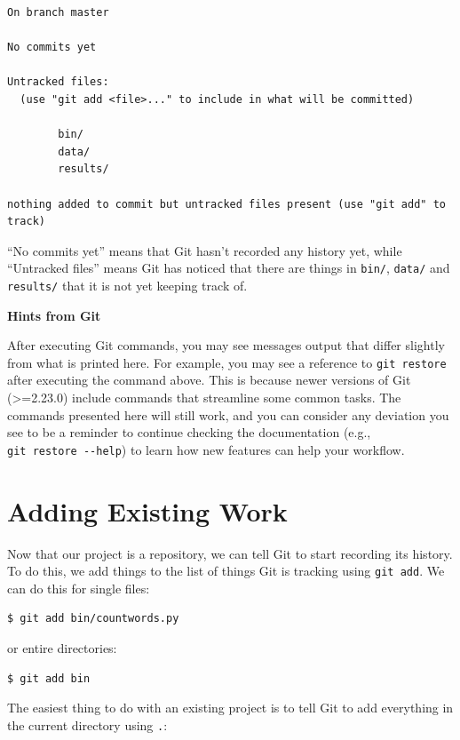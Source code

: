 \documentclass[
]{krantz}
\renewenvironment{quote}{\begin{VF}}{\end{VF}}
\begin{document}
\begin{verbatim}
On branch master

No commits yet

Untracked files:
  (use "git add <file>..." to include in what will be committed)

        bin/
        data/
        results/

nothing added to commit but untracked files present (use "git add" to track)
\end{verbatim}

``No commits yet'' means that Git hasn't recorded any history yet,
while ``Untracked files'' means Git has noticed that
there are things in \texttt{bin/}, \texttt{data/} and \texttt{results/}
that it is not yet keeping track of.

\begin{quote}
\textbf{Hints from Git}

After executing Git commands,
you may see messages output that differ slightly from what is printed here.
For example,
you may see a reference to \texttt{git\ restore} after executing the command above.
This is because newer versions of Git (\textgreater=2.23.0)
include commands that streamline some common tasks.
The commands presented here will still work,
and you can consider any deviation you see to be a reminder
to continue checking the documentation (e.g., \texttt{git\ restore\ -\/-help})
to learn how new features can help your workflow.
\end{quote}

\hypertarget{git-cmdline-add-existing}{%
\section{Adding Existing Work}\label{git-cmdline-add-existing}}

Now that our project is a repository,
we can tell Git to start recording its history.
To do this,
we add things to the list of things Git is tracking using \texttt{git\ add}.
We can do this for single files:

\begin{verbatim}
$ git add bin/countwords.py
\end{verbatim}

or entire directories:

\begin{verbatim}
$ git add bin
\end{verbatim}

The easiest thing to do with an existing project
is to tell Git to add everything in the current directory using \texttt{.}:
\end{document}

